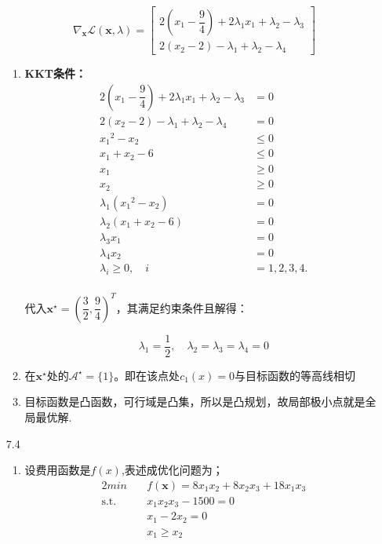 \documentclass[UTF8]{ctexart}
\begin{document}
\begin{enumerate}
\[\nabla_{\bm{x}}\mathcal{L}(\bm{x},\lambda)=\begin{bmatrix}
2(x_1-\dfrac{9}{4})+2\lambda_1x_1+\lambda_2-\lambda_3\\
2(x_2-2)-\lambda_1+\lambda_2-\lambda_4
\end{bmatrix}\]

\begin{enumerate}
\item

\textbf{KKT条件：}
\begin{align}
2(x_1-\dfrac{9}{4})+2\lambda_1x_1+\lambda_2-\lambda_3&=0\nonumber\\
2(x_2-2)-\lambda_1+\lambda_2-\lambda_4&=0\nonumber\\
{x_1}^2-x_2&\leq 0\nonumber\\
x_1+x_2-6&\leq 0\nonumber\\
		x_1&\geq 0\nonumber\\
	x_2&\geq 0\nonumber\\
\lambda_1({x_1}^2-x_2)&=0\nonumber\\
\lambda_2(x_1+x_2-6)&=0\nonumber\\
\lambda_3x_1&=0\nonumber\\
\lambda_4x_2&=0\nonumber\\
\lambda_i\geq0 ,\quad i&=1,2,3,4.\nonumber\\
\end{align}

代入$\bm{x}^{\star}=(\dfrac{3}{2},\dfrac{9}{4})^T$，其满足约束条件且解得：

\[\lambda_1=\dfrac{1}{2},\quad \lambda_2=\lambda_3=\lambda_4=0\]

\item
在$\bm{x}^{\star}$处的$\mathcal{A}^{\star}=\{1\}$。即在该点处$c_1(x)=0$与目标函数的等高线相切
\item
目标函数是凸函数，可行域是凸集，所以是凸规划，故局部极小点就是全局最优解.
\end{enumerate}
\item[7.4]
\begin{enumerate}
\item
设费用函数是$f(x)$,表述成优化问题为；
\begin{alignat}{2}
min \quad & f(\bm{x})=8{x_1}{x_2} +8{x_2}{x_3} +18{x_1}{x_3} \nonumber\\
\mbox{s.t.}\quad
&{x_1}{x_2}{x_3} - 1500= 0 \nonumber\\
&{x_1} - 2{x_2} = 0 \nonumber \\
&{x_1} \geq {x_2}  \nonumber 
\end{alignat}


\end{enumerate}
\end{enumerate}
\end{document}
